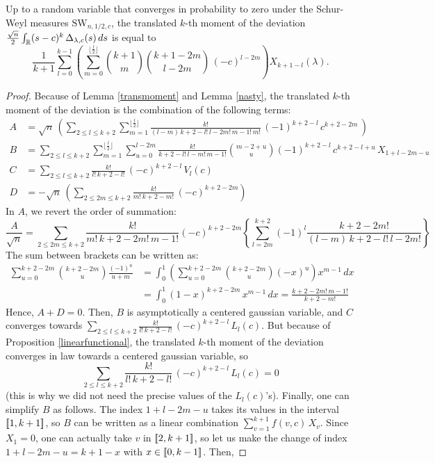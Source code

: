 \documentclass[10pt]{amsart}
\begin{document}
\begin{lemma}
Up to a random variable that converges in probability to zero under the Schur-Weyl measures $\mathrm{SW}_{n,1/2,c}$, the translated $k$-th moment of the deviation $\frac{\sqrt{n}}{2}\int_{\mathbb{R}}(s-c)^{k}\,\Delta_{\lambda,c}(s)\,ds$ is equal to
$$\frac{1}{k+1}\sum_{l=0}^{k-1}\left(\sum_{m=0}^{\lfloor \frac{l}{2} \rfloor} \binom{k+1}{m}\binom{k+1-2m}{l-2m}\,(-c)^{l-2m}\right)X_{k+1-l}(\lambda).$$
\end{lemma}
\begin{proof}
Because of Lemma \ref{transmoment} and Lemma \ref{nasty}, the translated $k$-th moment of the deviation is the combination of the following terms:
\begin{align*}
A&=\sqrt{n}\,\left(\sum_{2\leq l \leq k+2}\sum_{m=1}^{\lfloor \frac{l}{2}\rfloor } \frac{k!}{(l-m)\,k+2-l!\,l-2m!\,m-1!\,m!}\,(-1)^{k+2-l}\, c^{k+2-2m}\,\right)\\
B&=\sum_{2\leq l \leq k+2}\sum_{m=1}^{\lfloor \frac{l}{2}\rfloor }\sum_{u=0}^{l-2m} \frac{k!}{k+2-l!\,l-m!\,m-1!}\binom{m-2+u}{u}(-1)^{k+2-l}\,c^{k+2-l+u}\,X_{1+l-2m-u}\\
C&=\sum_{2\leq l \leq k+2} \frac{k!}{l!\,k+2-l!}\,(-c)^{k+2-l}\,V_{l}(c)\\
D&=-\sqrt{n}\,\left(\sum_{2\leq 2m \leq k+2}\frac{k!}{m!\,k+2-m!}\,(-c)^{k+2-2m}\right)
\end{align*}
In $A$, we revert the order of summation:
$$\frac{A}{\sqrt{n}}=\sum_{2\leq 2m \leq k+2}\frac{k!}{m!\,k+2-2m!\,m-1!}(-c)^{k+2-2m}\left\{\sum_{l=2m}^{k+2}(-1)^{l}\frac{k+2-2m!}{(l-m)\,k+2-l!\,l-2m!}\right\}$$
The sum between brackets can be written as:
\begin{align*}\sum_{u=0}^{k+2-2m}\binom{k+2-2m}{u}\frac{(-1)^{u}}{u+m}&=\int_{0}^{1}\left(\sum_{u=0}^{k+2-2m}\binom{k+2-2m}{u}(-x)^{u}\right)x^{m-1}\,dx\\
&=\int_{0}^{1}(1-x)^{k+2-2m}\,x^{m-1}\,dx=\frac{k+2-2m!\,m-1!}{k+2-m!}
\end{align*}
Hence, $A+D=0$. Then, $B$ is asymptotically a centered gaussian variable, and $C$ converges towards $\sum_{2\leq l \leq k+2} \frac{k!}{l!\,k+2-l!}\,(-c)^{k+2-l}\,L_{l}(c)$. But because of Proposition \ref{linearfunctional}, the translated $k$-th moment of the deviation converges in law towards a centered gaussian variable, so
$$\sum_{2\leq l \leq k+2} \frac{k!}{l!\,k+2-l!}\,(-c)^{k+2-l}\,L_{l}(c)=0$$
 (this is why we did not need the precise values of the $L_{l}(c)$'s). Finally, one can simplify $B$ as follows. The index $1+l-2m-u$ takes its values in the interval $\left[\!\left[ 1,k+1\right]\!\right]$, so $B$ can be written as a linear combination $\sum_{v=1}^{k+1} f(v,c)\,X_{v}$. Since $X_{1}=0$, one can actually take $v$ in $\left[\!\left[ 2,k+1 \right]\!\right]$, so let us make the change of index $1+l-2m-u=k+1-x$ with $x \in \left[\!\left[ 0,k-1\right]\!\right]$. Then,

\end{proof}
\end{document}
